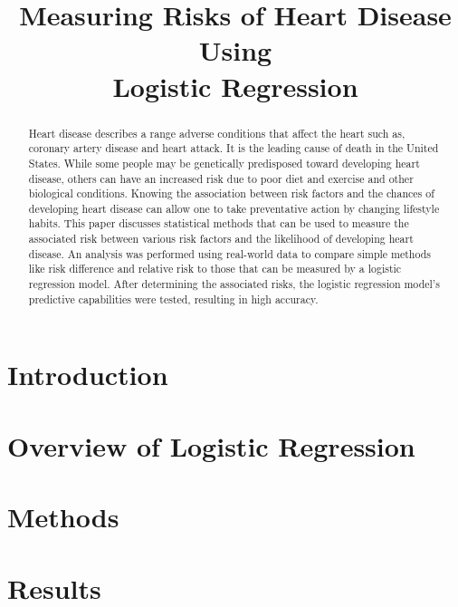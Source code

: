 \documentclass[journal,12pt,onecolumn]{article}
\begin{document}
\title{Measuring Risks of Heart Disease Using \\
Logistic Regression}

\maketitle
\clearpage

\begin{abstract}
    Heart disease describes a range adverse conditions that affect the heart such as, coronary artery disease and heart attack. 
    It is the leading cause of death in the United States.
    While some people may be genetically predisposed toward developing heart disease, others can have an increased risk due to poor diet and exercise and other biological conditions.
    Knowing the association between risk factors and the chances of developing heart disease can allow one to take preventative action by changing lifestyle habits.
    This paper discusses statistical methods that can be used to measure the associated risk between various risk factors and the likelihood of developing heart disease. An analysis was performed using real-world data to compare simple methods like risk difference and relative risk to those that can be measured by a logistic regression model.
    After determining the associated risks, the logistic regression model's predictive capabilities were tested, resulting in high accuracy.
\end{abstract}
\clearpage


\section{Introduction}


\section{Overview of Logistic Regression}


\section{Methods}


\section{Results}\label{sec:Results}

\end{document}
